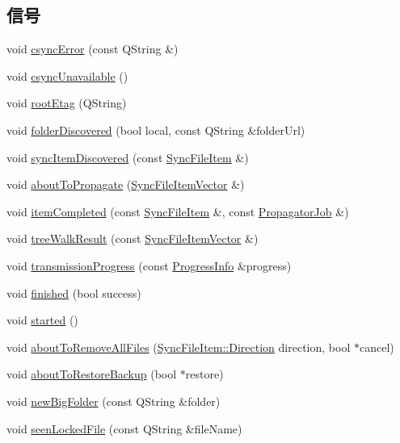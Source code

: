 \subsection*{信号}
\begin{DoxyCompactItemize}
\item 
void \hyperlink{class_o_c_c_1_1_sync_engine_ae46ce9f703858001be51d217819108e3}{csync\+Error} (const Q\+String \&)
\item 
void \hyperlink{class_o_c_c_1_1_sync_engine_a61cf256fb8386ee796651636d8802863}{csync\+Unavailable} ()
\item 
void \hyperlink{class_o_c_c_1_1_sync_engine_abe6c7ea1c8079e39a32067f49142ba8c}{root\+Etag} (Q\+String)
\item 
void \hyperlink{class_o_c_c_1_1_sync_engine_adf9793aba50cb62b29baafaf2c12d17e}{folder\+Discovered} (bool local, const Q\+String \&folder\+Url)
\item 
void \hyperlink{class_o_c_c_1_1_sync_engine_a3c4f0963b5256cabb90d13b82c0a7c7c}{sync\+Item\+Discovered} (const \hyperlink{class_o_c_c_1_1_sync_file_item}{Sync\+File\+Item} \&)
\item 
void \hyperlink{class_o_c_c_1_1_sync_engine_a40f30a576b2679288b6cda1601c354b5}{about\+To\+Propagate} (\hyperlink{namespace_o_c_c_af407f0fdf0476e0bfce478be3d0e441e}{Sync\+File\+Item\+Vector} \&)
\item 
void \hyperlink{class_o_c_c_1_1_sync_engine_a0b820a5f033080d7d979a91f0c1fbc6b}{item\+Completed} (const \hyperlink{class_o_c_c_1_1_sync_file_item}{Sync\+File\+Item} \&, const \hyperlink{class_o_c_c_1_1_propagator_job}{Propagator\+Job} \&)
\item 
void \hyperlink{class_o_c_c_1_1_sync_engine_a9affd8895a4c8e5ef3ec77c0f208be5a}{tree\+Walk\+Result} (const \hyperlink{namespace_o_c_c_af407f0fdf0476e0bfce478be3d0e441e}{Sync\+File\+Item\+Vector} \&)
\item 
void \hyperlink{class_o_c_c_1_1_sync_engine_a2d67912728bfd3399b276cb59dfffc4f}{transmission\+Progress} (const \hyperlink{class_o_c_c_1_1_progress_info}{Progress\+Info} \&progress)
\item 
void \hyperlink{class_o_c_c_1_1_sync_engine_a9a5aada134efb189b24db159e8b11c4f}{finished} (bool success)
\item 
void \hyperlink{class_o_c_c_1_1_sync_engine_af4b29327245521fb428e658365052d21}{started} ()
\item 
void \hyperlink{class_o_c_c_1_1_sync_engine_a9702dae2961cd351fe034e4ef5dfbf1a}{about\+To\+Remove\+All\+Files} (\hyperlink{class_o_c_c_1_1_sync_file_item_ad6db6c9821da051d0c790fb50603922b}{Sync\+File\+Item\+::\+Direction} direction, bool $\ast$cancel)
\item 
void \hyperlink{class_o_c_c_1_1_sync_engine_abcf3c65f0aa430771b8b5dfb8750c03a}{about\+To\+Restore\+Backup} (bool $\ast$restore)
\item 
void \hyperlink{class_o_c_c_1_1_sync_engine_a6d22c11aa932955d24aeb59b72254cc6}{new\+Big\+Folder} (const Q\+String \&folder)
\item 
void \hyperlink{class_o_c_c_1_1_sync_engine_a0328f90d49fc72ff376aac7c042373f0}{seen\+Locked\+File} (const Q\+String \&file\+Name)
\end{DoxyCompactItemize}
